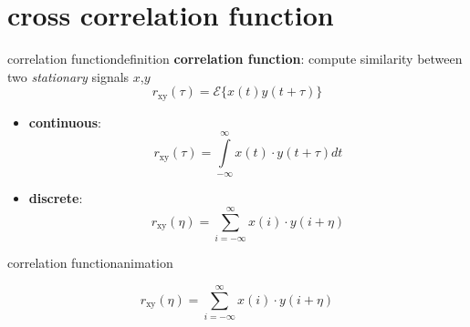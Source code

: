     \section[CCF]{cross correlation function}
        \begin{frame}{correlation function}{definition}
            \textbf{correlation function}: compute similarity between two \textit{stationary} signals $x$,$y$
            \begin{equation*}
                r_\mathrm{xy}(\tau)=\mathcal{E}\lbrace x(t)y(t+\tau)\rbrace  
            \end{equation*}  
            
            \begin{itemize}
                \item	\textbf{continuous}:
                    \begin{equation*}
                        r_\mathrm{xy}(\tau) = \int\limits_{-\infty}^{\infty}{x(t)\cdot y(t+\tau)dt}
                    \end{equation*}
                \item	\textbf{discrete}:
                    \begin{equation*}
                        r_\mathrm{xy}(\eta) = \sum\limits_{i=-\infty}^{\infty}{x(i)\cdot y(i+\eta)}
                    \end{equation*}
            \end{itemize}
        \end{frame}	

        \begin{frame}{correlation function}{animation}
            \vspace{-5mm}
            \begin{footnotesize}
                    \begin{equation*}
                        r_\mathrm{xy}(\eta) = \sum\limits_{i=-\infty}^{\infty}{x(i)\cdot y(i+\eta)}
                    \end{equation*}
            \end{footnotesize}
            \begin{center}
            \end{center}
        \end{frame}

